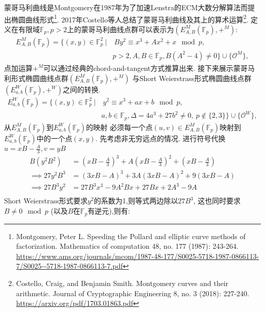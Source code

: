 \documentclass{article}
\newcommand{\F}{\mathbb{F}}
\begin{document}
蒙哥马利曲线是Montgomery在1987年为了加速Lenstra的ECM大数分解算法而提出椭圆曲线形式\footnote{
Montgomery, Peter L. Speeding the Pollard and elliptic curve methods of factorization.
Mathematics of computation 48, no. 177 (1987): 243-264. 
\url{https://www.ams.org/journals/mcom/1987-48-177/S0025-5718-1987-0866113-7/S0025--5718-1987-0866113-7.pdf}}.
2017年Costello等人总结了蒙哥马利曲线及其上的算术运算\footnote{
Costello, Craig, and Benjamin Smith. 
Montgomery curves and their arithmetic. 
Journal of Cryptographic Engineering 8, no. 3 (2018): 227-240.
\url{https://arxiv.org/pdf/1703.01863.pdf}}.
定义在有限域$\F_p, p>2$上的蒙哥马利曲线点群可以表示为$(E_{A,B}^M(\F_p), +^M)$:
\begin{equation*}
\begin{split}
E_{A,B}^M(\F_p) = \{(x,y)\in\F_p^2\  | &\  B y^2 \equiv x^3 + A x^2 + x\mod p, \\
& p >2, A, B \in \F_p, B(A^2-4)\neq 0 \} \cup \{\mathcal{O}^M\},
\end{split}
\end{equation*}
点加运算$+^M$可以通过经典的chord-and-tangent方式推算出来.
接下来展示蒙哥马利形式椭圆曲线点群$(E_{A,B}^M(\F_p), +^M)$
与Short Weierstrass形式椭圆曲线点群$(E_{a,b}^{W}(\F_p), +^W)$之间的转换.
\begin{equation*}
\begin{split}
E_{a,b}^{W}(\F_p)= \{(x,y)\in \F_p^2\ | & \ y^2 \equiv x^3 + ax + b \mod p, \\
 & a, b \in \F_p, \Delta = 4a^3 + 27b^2 \neq 0, \ p \notin \{2,3\}\} \cup \{\mathcal{O}^W\},
\end{split}
\end{equation*}
从$E_{A,B}^M(\F_p)$到$E_{a,b}^{W}(\F_p)$的映射
必须每一个点$(u,v)\in E_{A,B}^M(\F_p)$映射到$E_{a,b}^{W}(\F_p)$中的一个点$(x,y)$.
先考虑非无穷远点的情况.
进行符号代换$u = xB - \frac{A}{3}, v = yB$
\begin{equation*}
\begin{split}
B\left(y^2B^2\right) & = \left( xB - \frac{A}{3} \right)^3 + 
A \left( xB - \frac{A}{3} \right)^2 +  \left(xB - \frac{A}{3}\right) \\
\implies 
27 y^2 B^3 & = (3xB - A)^3 + 3A(3xB-A)^2 + 9(3xB - A) \\
\implies 
27 B^3 y^2 & = 27B^3x^3 - 9A^2Bx + 27Bx + 2A^3 - 9A \\
\end{split}
\end{equation*}
Short Weierstrass形式要求$y^2$的系数为1,则等式两边除以$27B^3$,
这也同时要求$B\neq 0\mod p$ (以及$B$在$\F_p$有逆元),则有:
\end{document}
